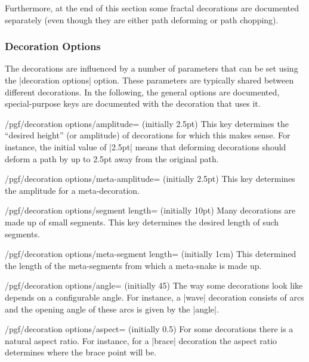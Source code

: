 Furthermore, at the end of this section some fractal decorations are
documented separately (even though they are either path deforming or
path chopping).


\subsubsection{Decoration Options}

The decorations are influenced by a number of parameters that can be
set using the |decoration options| option. These parameters are
typically shared between different decorations. In the following, the
general options are documented, special-purpose keys are documented
with the decoration that uses it.

\begin{key}{/pgf/decoration options/amplitude= (initially 2.5pt)}
  This key determines the ``desired height'' (or amplitude) of 
  decorations for which this makes sense. For instance, the initial
  value of |2.5pt| means that deforming decorations should deform a
  path by up to 2.5pt away from the original path.
\end{key}

\begin{key}{/pgf/decoration options/meta-amplitude= (initially 2.5pt)}
  This key determines the amplitude for a meta-decoration. 
\end{key}

\begin{key}{/pgf/decoration options/segment length= (initially 10pt)}
  Many decorations are made up of small segments. This key determines
  the desired length of such segments. 
\end{key}

\begin{key}{/pgf/decoration options/meta-segment length= (initially 1cm)}
  This determined the length of the meta-segments from which a
  meta-snake is made up.
\end{key}

\begin{key}{/pgf/decoration options/angle= (initially 45)}
  The way some decorations look like depends on a configurable angle. For
  instance, a |wave| decoration consists of arcs and the opening angle
  of these arcs is given by the |angle|.
\end{key}

\begin{key}{/pgf/decoration options/aspect= (initially 0.5)}
  For some decorations there is a natural aspect ratio. For instance,
  for a |brace| decoration the aspect ratio determines where the brace
  point will be.
\end{key}

